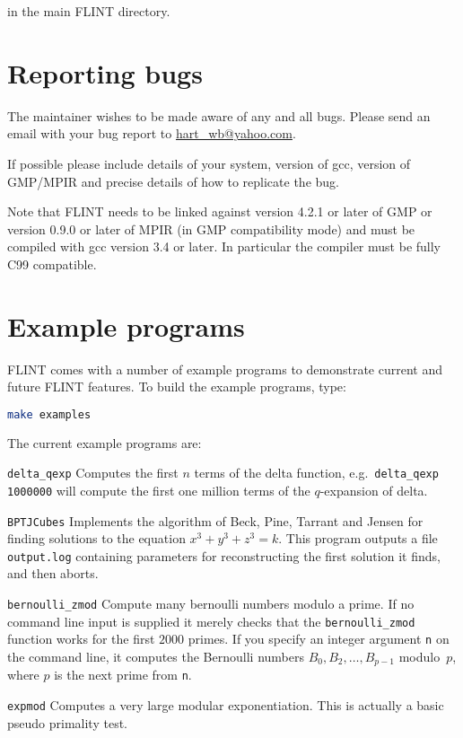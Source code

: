 \documentclass[a4paper,10pt]{book}
\newcommand{\code}{\lstinline}
\begin{document}
in the main FLINT directory.

\section{Reporting bugs}

The maintainer wishes to be made aware of any and all bugs.  Please send an 
email with your bug report to \url{hart_wb@yahoo.com}.

If possible please include details of your system, version of gcc, version 
of GMP/MPIR and precise details of how to replicate the bug.

Note that FLINT needs to be linked against version 4.2.1 or later of GMP 
or version 0.9.0 or later of MPIR (in GMP compatibility mode) and must be 
compiled with gcc version 3.4 or later.  In particular the compiler must be 
fully C99 compatible.

\section{Example programs}

FLINT comes with a number of example programs to demonstrate current and 
future FLINT features.  To build the example programs, type:

\begin{lstlisting}[language=bash]
make examples
\end{lstlisting}

The current example programs are:

\code{delta_qexp}  Computes the first $n$ terms of the delta function, e.g.\ 
\code{delta_qexp 1000000} will compute the first one million terms of the 
$q$-expansion of delta.

\code{BPTJCubes}  Implements the algorithm of Beck, Pine, Tarrant and Jensen 
for finding solutions to the equation $x^3+y^3+z^3 = k$.  This program 
outputs a file \code{output.log} containing parameters for reconstructing the 
first solution it finds, and then aborts.

\code{bernoulli_zmod} Compute many bernoulli numbers modulo a prime.  If no 
command line input is supplied it merely checks that the \code{bernoulli_zmod} 
function works for the first $2000$ primes.  If you specify an integer 
argument \code{n} on the command line, it computes the Bernoulli numbers 
$B_0, B_2, \dotsc, B_{p-1}$ modulo~$p$, where $p$ is the next prime from 
\code{n}.

\code{expmod}  Computes a very large modular exponentiation.  This is actually 
a basic pseudo primality test.
\end{document}
